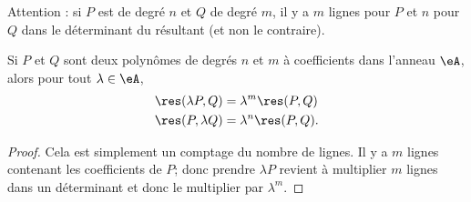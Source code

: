 Attention : si \( P\) est de degré \( n\) et \( Q\) de degré \( m\), il y a \( m\) lignes pour \( P\) et \( n\) pour \( Q\) dans le déterminant du résultant (et non le contraire).

\begin{lemma}       \label{LemBFrhgnA}
	Si \( P\) et \( Q\) sont deux polynômes de degrés \( n\) et \( m\) à coefficients dans l'anneau \( \eA\), alors pour tout \( \lambda\in \eA\),
	\begin{subequations}
		\begin{align}
			\res(\lambda P,Q) & =\lambda^m\res(P,Q)  \\
			\res(P,\lambda Q) & =\lambda^n\res(P,Q).
		\end{align}
	\end{subequations}
\end{lemma}

\begin{proof}
	Cela est simplement un comptage du nombre de lignes. Il y a \( m\) lignes contenant les coefficients de \( P\); donc prendre \( \lambda P\) revient à multiplier \( m\) lignes dans un déterminant et donc le multiplier par \( \lambda^m\).
\end{proof}

